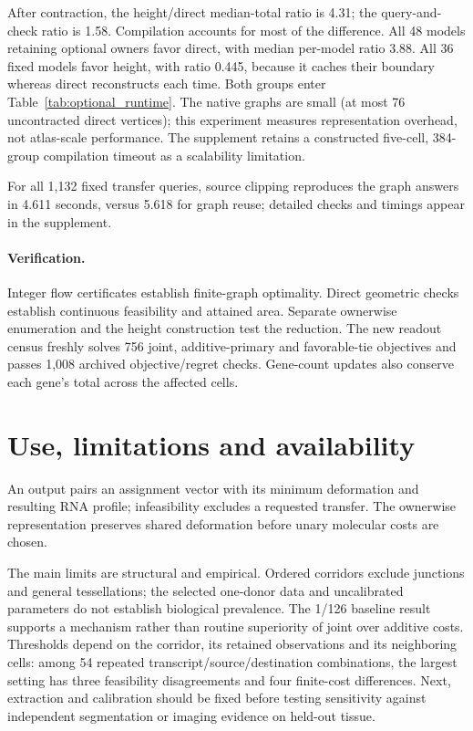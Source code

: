 \documentclass[10pt,letterpaper]{article}
\begin{document}
After contraction, the height/direct median-total ratio is 4.31; the query-and-check ratio is 1.58. Compilation accounts for most of the difference. All 48 models retaining optional owners favor direct, with median per-model ratio 3.88. All 36 fixed models favor height, with ratio 0.445, because it caches their boundary whereas direct reconstructs each time. Both groups enter Table~\ref{tab:optional_runtime}. The native graphs are small (at most 76 uncontracted direct vertices); this experiment measures representation overhead, not atlas-scale performance. The supplement retains a constructed five-cell, 384-group compilation timeout as a scalability limitation.

For all 1,132 fixed transfer queries, source clipping reproduces the graph answers in 4.611 seconds, versus 5.618 for graph reuse; detailed checks and timings appear in the supplement.

\paragraph{Verification.}
Integer flow certificates establish finite-graph optimality. Direct geometric checks establish continuous feasibility and attained area. Separate ownerwise enumeration and the height construction test the reduction. The new readout census freshly solves 756 joint, additive-primary and favorable-tie objectives and passes 1,008 archived objective/regret checks. Gene-count updates also conserve each gene's total across the affected cells. 

\section{Use, limitations and availability}
An output pairs an assignment vector with its minimum deformation and resulting RNA profile; infeasibility excludes a requested transfer. The ownerwise representation preserves shared deformation before unary molecular costs are chosen.

The main limits are structural and empirical. Ordered corridors exclude junctions and general tessellations; the selected one-donor data and uncalibrated parameters do not establish biological prevalence. The 1/126 baseline result supports a mechanism rather than routine superiority of joint over additive costs. Thresholds depend on the corridor, its retained observations and its neighboring cells: among 54 repeated transcript/source/destination combinations, the largest setting has three feasibility disagreements and four finite-cost differences. Next, extraction and calibration should be fixed before testing sensitivity against independent segmentation or imaging evidence on held-out tissue.
\end{document}
